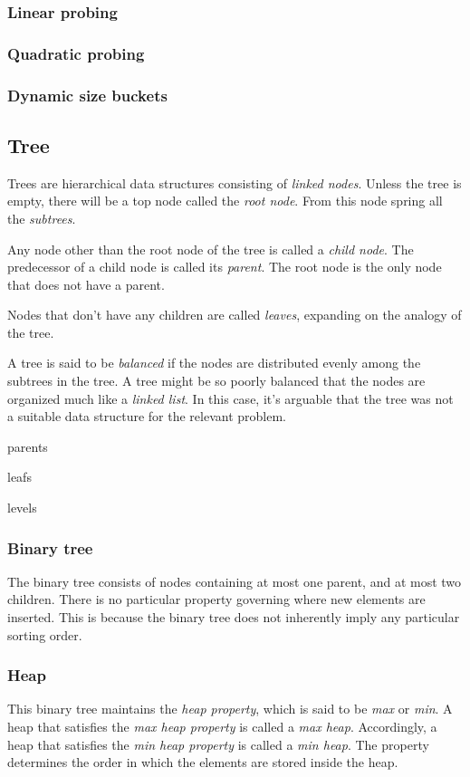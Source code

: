 \documentclass{article}
\begin{document}
\subsubsection{Linear probing}
\subsubsection{Quadratic probing}
\subsubsection{Dynamic size buckets}

\newpage


\subsection{Tree}
Trees are hierarchical data structures consisting of {\em linked nodes}.
Unless the tree is empty, there will be a top node called the {\em root node}.
From this node spring all the {\em subtrees}.

Any node other than the root node of the tree is called a {\em child node}.
The predecessor of a child node is called its {\em parent}.
The root node is the only node that does not have a parent.

Nodes that don't have any children are called {\em leaves}, expanding on the analogy of the tree.

A tree is said to be {\em balanced} if the nodes are distributed evenly among the subtrees in the tree.
A tree might be so poorly balanced that the nodes are organized much like a {\em linked list}.
In this case, it's arguable that the tree was not a suitable data structure for the relevant problem.


parents

leafs

levels

\subsubsection{Binary tree}
The binary tree consists of nodes containing at most one parent, and at most two children.
There is no particular property governing where new elements are inserted.
This is because the binary tree does not inherently imply any particular sorting order.

\subsubsection{Heap}
This binary tree maintains the {\em heap property}, which is said to be {\em max} or {\em min}.
A heap that satisfies the {\em max heap property} is called a {\em max heap}.
Accordingly, a heap that satisfies the {\em min heap property} is called a {\em min heap}.
The property determines the order in which the elements are stored inside the heap.
\end{document}
